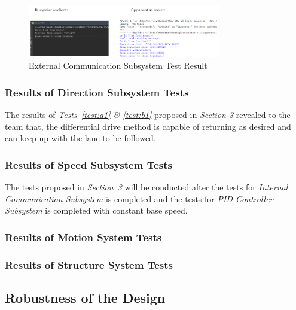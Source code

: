 \documentclass[a4paper,12pt]{article}
\begin{document}
	
	\begin{figure}[h]
		\includegraphics[width=0.75\textwidth,center]{images/hsake2}
		\caption{External Communication Subsystem Test Result \label{fig:hsake_test2} }
	\end{figure}
	
	
	
	\subsubsection*{Results of Direction Subsystem Tests}
	
	The results of \textit{Tests~\ref{test:a1} \& \ref{test:b1}} proposed in \textit{Section 3} revealed to the team that, the differential drive method is capable of returning as desired and can keep up with the lane to be followed.
		
	
	\subsubsection*{Results of Speed Subsystem Tests}
	 
	 The tests proposed in \textit{Section~3} will be conducted after the tests for \textit{Internal Communication Subsystem} is completed and the tests for \textit{PID Controller Subsystem} is completed with constant base speed. 
	
	
	\subsubsection*{Results of Motion System Tests}
	
	
	
	\subsubsection*{Results of Structure System Tests}
	
	
	
	\subsection{Robustness of the Design}
	
	
	
\end{document}
